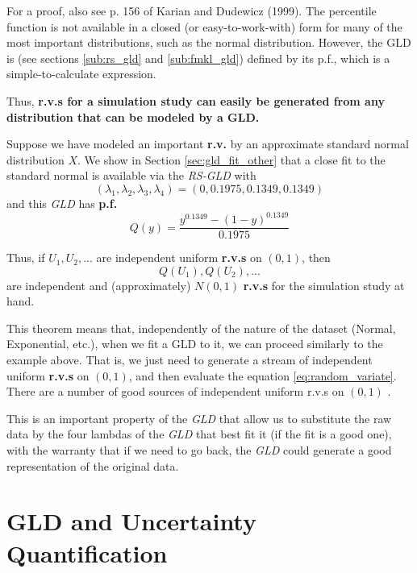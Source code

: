 For a proof, also see p. 156 of Karian and Dudewicz (1999). The percentile function is not available in a closed (or easy-to-work-with) form for many of the most important distributions, such as the normal distribution. However, the GLD is (see sections \ref{sub:rs_gld} and \ref{sub:fmkl_gld}) defined by its p.f., which is a simple-to-calculate expression.

Thus, \textbf{r.v.s for a simulation study can easily be generated from any distribution that can be modeled by a GLD.}

\begin{exmp}
Suppose we have modeled an important \textbf{r.v.} by an approximate standard normal distribution $X$. We show in Section \ref{sec:gld_fit_other} that a close fit to the standard normal is available via the \textit{RS-GLD} with 
\begin{equation}
(\lambda_{1}, \lambda_{2}, \lambda_{3}, \lambda_{4}) = (0, 0.1975, 0.1349, 0.1349)
\end{equation}
and this \textit{GLD} has \textbf{p.f.} 
\begin{equation}
Q(y) = \frac{y^{0.1349}-(1-y)^{0.1349}}{0.1975}
\end{equation}
\end{exmp}

Thus, if $U_{1}, U_{2},...$ are independent uniform \textbf{r.v.s} on $(0, 1)$, then 
\begin{equation}\label{eq:random_variate}
Q(U_{1}), Q(U_{2}),...
\end{equation}
are independent and (approximately) $N(0, 1)$ \textbf{r.v.s} for the simulation study at hand.

This theorem means that, independently of the nature of the dataset (Normal, Exponential, etc.), when we fit a GLD to it, we can proceed similarly to the example above. That is, we just need to generate a stream of independent uniform \textbf{r.v.s} on $(0, 1)$, and then evaluate the equation \ref{eq:random_variate}. There are a number of good sources of independent uniform r.v.s on $(0, 1)$ \cite{Karian2011}. 

This is an important property of the \textit{GLD} that allow us to substitute the raw data by the four lambdas of the \textit{GLD} that best fit it (if the fit is a good one), with the warranty that if we need to go back, the \textit{GLD} could generate a good representation of the original data.


\section{GLD and Uncertainty Quantification}
